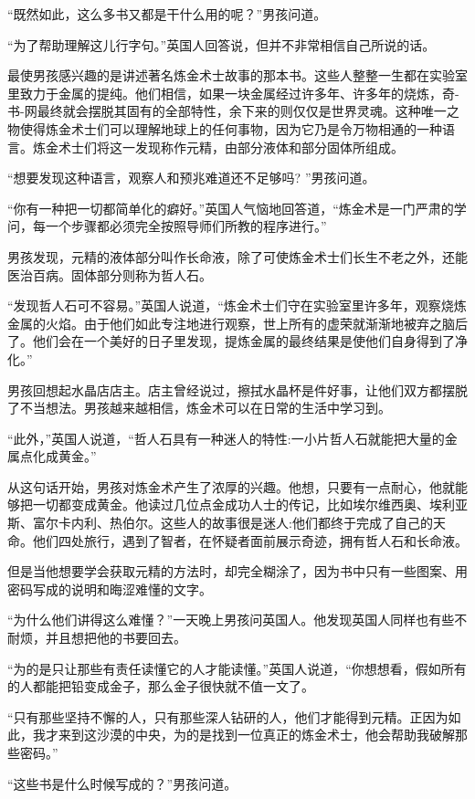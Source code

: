 \documentclass[twoside,openany]{book}
\begin{document}
“既然如此，这么多书又都是干什么用的呢？”男孩问道。

“为了帮助理解这儿行字句。”英国人回答说，但并不非常相信自己所说的话。

最使男孩感兴趣的是讲述著名炼金术士故事的那本书。这些人整整一生都在实验室里致力于金属的提纯。他们相信，如果一块金属经过许多年、许多年的烧炼，奇-书-网最终就会摆脱其固有的全部特性，余下来的则仅仅是世界灵魂。这种唯一之物使得炼金术士们可以理解地球上的任何事物，因为它乃是令万物相通的一种语言。炼金术士们将这一发现称作元精，由部分液体和部分固体所组成。

“想要发现这种语言，观察人和预兆难道还不足够吗? ”男孩问道。

“你有一种把一切都简单化的癖好。”英国人气恼地回答道，“炼金术是一门严肃的学问，每一个步骤都必须完全按照导师们所教的程序进行。”

男孩发现，元精的液体部分叫作长命液，除了可使炼金术士们长生不老之外，还能医治百病。固体部分则称为哲人石。

“发现哲人石可不容易。”英国人说道，“炼金术士们守在实验室里许多年，观察烧炼金属的火焰。由于他们如此专注地进行观察，世上所有的虚荣就渐渐地被弃之脑后了。他们会在一个美好的日子里发现，提炼金属的最终结果是使他们自身得到了净化。”

男孩回想起水晶店店主。店主曾经说过，擦拭水晶杯是件好事，让他们双方都摆脱了不当想法。男孩越来越相信，炼金术可以在日常的生活中学习到。

“此外，”英国人说道，“哲人石具有一种迷人的特性:一小片哲人石就能把大量的金属点化成黄金。”

从这句话开始，男孩对炼金术产生了浓厚的兴趣。他想，只要有一点耐心，他就能够把一切都变成黄金。他读过几位点金成功人士的传记，比如埃尔维西奥、埃利亚斯、富尔卡内利、热伯尔。这些人的故事很是迷人:他们都终于完成了自己的天命。他们四处旅行，遇到了智者，在怀疑者面前展示奇迹，拥有哲人石和长命液。

但是当他想要学会获取元精的方法时，却完全糊涂了，因为书中只有一些图案、用密码写成的说明和晦涩难懂的文字。

“为什么他们讲得这么难懂？”一天晚上男孩问英国人。他发现英国人同样也有些不耐烦，并且想把他的书要回去。

“为的是只让那些有责任读懂它的人才能读懂。”英国人说道，“你想想看，假如所有的人都能把铅变成金子，那么金子很快就不值一文了。

“只有那些坚持不懈的人，只有那些深人钻研的人，他们才能得到元精。正因为如此，我才来到这沙漠的中央，为的是找到一位真正的炼金术士，他会帮助我破解那些密码。”

“这些书是什么时候写成的？”男孩问道。
\end{document}
